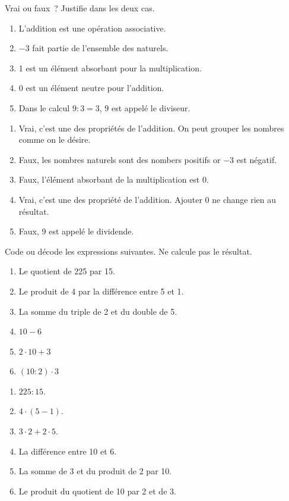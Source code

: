 \documentclass[../../syllabus_1.tex]{subfiles}
\begin{document}
\begin{exercise}
    Vrai ou faux~? Justifie dans les deux cas.
    \begin{enumerate}
        \item L'addition est une opération associative.
        \item $-3$ fait partie de l'ensemble des naturels.
        \item 1 est un élément absorbant pour la multiplication.
        \item 0 est un élément neutre pour l'addition.
        \item Dans le calcul \(9 : 3 = 3\), \(9\) est appelé le diviseur.
    \end{enumerate}
\end{exercise}
\begin{solution}
    \begin{enumerate}
        \item Vrai, c'est une des propriétés de l'addition. On peut grouper les nombres comme on le désire.
        \item Faux, les nombres naturels sont des nombers positifs or $-3$ est négatif.
        \item Faux, l'élément absorbant de la multiplication est 0.
        \item Vrai, c'est une des propriété de l'addition. Ajouter 0 ne change rien au résultat.
        \item Faux, 9 est appelé le dividende.
    \end{enumerate}
\end{solution}

\begin{exercise}
    Code ou décode les expressions suivantes. Ne calcule pas le résultat.
    \begin{enumerate}
        \item Le quotient de 225 par 15.
        \item Le produit de 4 par la différence entre 5 et 1.
        \item La somme du triple de 2 et du double de 5.
        \item \(10 - 6\)
        \item \(2 \cdot 10 + 3\)
        \item \((10 : 2) \cdot 3\)
    \end{enumerate}
\end{exercise}
\begin{solution}
    \begin{enumerate}
        \item $225 : 15$.
        \item $4 \cdot (5 - 1)$.
        \item $3 \cdot 2 + 2 \cdot 5$.
        \item La différence entre 10 et 6.
        \item La somme de 3 et du produit de 2 par 10.
        \item Le produit du quotient de 10 par 2 et de 3.
    \end{enumerate}
\end{solution}
\end{document}
